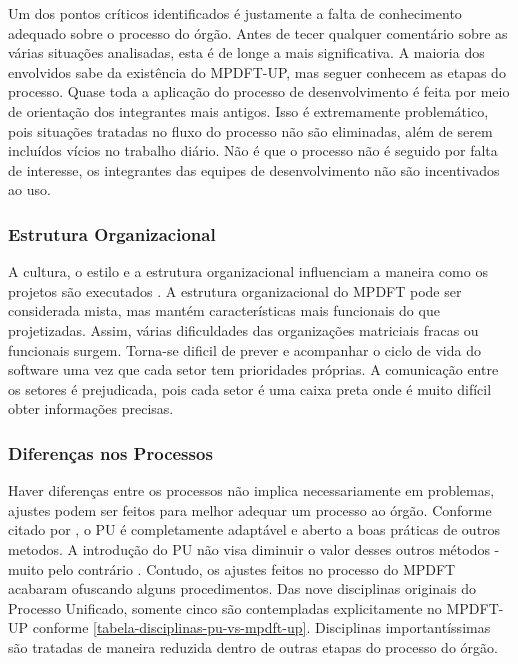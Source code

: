 \documentclass[
	article,			%
	11pt,				%
	oneside,			%
	a4paper,			%
	english,			%
	brazil,				%
	sumario=tradicional
	]{abntex2}
\begin{document}
Um dos pontos críticos identificados é justamente a falta de conhecimento
adequado sobre o processo do órgão. Antes de tecer qualquer comentário sobre as
várias situações analisadas, esta é de longe a mais significativa. A maioria dos
envolvidos sabe da existência do MPDFT-UP, mas seguer conhecem as etapas do
processo. Quase toda a aplicação do processo de desenvolvimento é feita por meio
de orientação dos integrantes mais antigos. Isso é extremamente problemático,
pois situações tratadas no fluxo do processo não são eliminadas, além de serem
incluídos vícios no trabalho diário. Não é que o processo não é seguido por
falta de interesse, os integrantes das equipes de desenvolvimento não são
incentivados ao uso.

\subsubsection{Estrutura Organizacional}

A cultura, o estilo e a estrutura organizacional influenciam a maneira como os
projetos são executados \cite[pag. 30]{pmi2008pmbok}. A estrutura organizacional
do MPDFT pode ser considerada mista, mas mantém características mais funcionais
do que projetizadas. Assim, várias dificuldades das organizações matriciais
fracas ou funcionais surgem. Torna-se dificil de prever e acompanhar o ciclo de
vida do software uma vez que cada setor tem prioridades próprias. A comunicação
entre os setores é prejudicada, pois cada setor é uma caixa preta onde é muito
difícil obter informações precisas.

\subsubsection{Diferenças nos Processos}

Haver diferenças entre os processos não implica necessariamente em problemas,
ajustes podem ser feitos para melhor adequar um processo ao órgão. Conforme
citado por , o PU é completamente adaptável e
aberto a boas práticas de outros metodos. A introdução do PU não visa diminuir o
valor desses outros métodos - muito pelo contrário \cite{larman2007utilizando}.
Contudo, os ajustes feitos no processo do MPDFT acabaram ofuscando alguns
procedimentos. Das nove disciplinas originais do Processo Unificado, somente
cinco são contempladas explicitamente no MPDFT-UP conforme
\autoref{tabela-disciplinas-pu-vs-mpdft-up}. Disciplinas importantíssimas são
tratadas de maneira reduzida dentro de outras etapas do processo do órgão.
\end{document}
